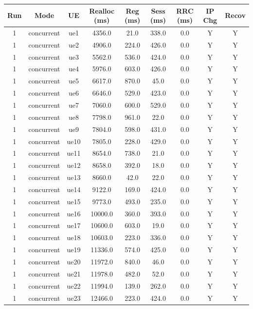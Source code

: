 \begin{table}[ht]
\centering
\begin{tabular}{|c|c|c|c|c|c|c|c|c|}
\hline
Run & Mode & UE & Realloc (ms) & Reg (ms) & Sess (ms) & RRC (ms) & IP Chg & Recov \\
\hline
1 & concurrent & ue1 & 4356.0 & 21.0 & 338.0 & 0.0 & Y & Y \\
1 & concurrent & ue2 & 4906.0 & 224.0 & 426.0 & 0.0 & Y & Y \\
1 & concurrent & ue3 & 5562.0 & 536.0 & 424.0 & 0.0 & Y & Y \\
1 & concurrent & ue4 & 5976.0 & 603.0 & 426.0 & 0.0 & Y & Y \\
1 & concurrent & ue5 & 6617.0 & 870.0 & 45.0 & 0.0 & Y & Y \\
1 & concurrent & ue6 & 6646.0 & 529.0 & 423.0 & 0.0 & Y & Y \\
1 & concurrent & ue7 & 7060.0 & 600.0 & 529.0 & 0.0 & Y & Y \\
1 & concurrent & ue8 & 7798.0 & 961.0 & 22.0 & 0.0 & Y & Y \\
1 & concurrent & ue9 & 7804.0 & 598.0 & 431.0 & 0.0 & Y & Y \\
1 & concurrent & ue10 & 7805.0 & 228.0 & 429.0 & 0.0 & Y & Y \\
1 & concurrent & ue11 & 8654.0 & 738.0 & 21.0 & 0.0 & Y & Y \\
1 & concurrent & ue12 & 8658.0 & 392.0 & 18.0 & 0.0 & Y & Y \\
1 & concurrent & ue13 & 8660.0 & 42.0 & 22.0 & 0.0 & Y & Y \\
1 & concurrent & ue14 & 9122.0 & 169.0 & 424.0 & 0.0 & Y & Y \\
1 & concurrent & ue15 & 9773.0 & 493.0 & 235.0 & 0.0 & Y & Y \\
1 & concurrent & ue16 & 10000.0 & 360.0 & 393.0 & 0.0 & Y & Y \\
1 & concurrent & ue17 & 10600.0 & 603.0 & 19.0 & 0.0 & Y & Y \\
1 & concurrent & ue18 & 10603.0 & 223.0 & 336.0 & 0.0 & Y & Y \\
1 & concurrent & ue19 & 11336.0 & 574.0 & 425.0 & 0.0 & Y & Y \\
1 & concurrent & ue20 & 11972.0 & 840.0 & 46.0 & 0.0 & Y & Y \\
1 & concurrent & ue21 & 11978.0 & 482.0 & 52.0 & 0.0 & Y & Y \\
1 & concurrent & ue22 & 11994.0 & 139.0 & 262.0 & 0.0 & Y & Y \\
1 & concurrent & ue23 & 12466.0 & 223.0 & 424.0 & 0.0 & Y & Y \\

\end{tabular}
\end{table}
